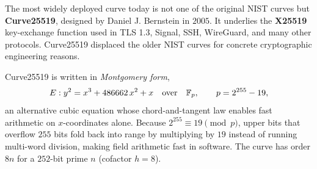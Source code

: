 The most widely deployed curve today is not one of the original NIST curves but
\textbf{Curve25519}, designed by Daniel J. Bernstein in $2005$. It underlies the
\textbf{X25519} key-exchange function used in TLS 1.3, Signal, SSH, WireGuard, and many
other protocols. Curve25519 displaced the older NIST curves for concrete cryptographic
engineering reasons.

Curve25519 is written in \emph{Montgomery form},
\[
E : y^2 = x^3 + 486662\,x^2 + x \quad \text{over}\quad \mathbb{F}_p, \qquad p = 2^{255} - 19,
\]
an alternative cubic equation whose chord-and-tangent law enables fast arithmetic on
$x$-coordinates alone. Because $2^{255} \equiv 19 \pmod p$, upper bits that overflow $255$
bits fold back into range by multiplying by $19$ instead of running multi-word division,
making field arithmetic fast in software. The curve has order $8n$ for a $252$-bit prime
$n$ (cofactor $h = 8$).

